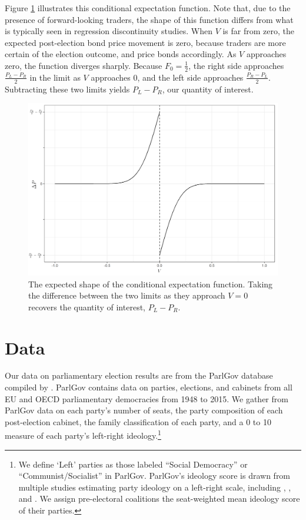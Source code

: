 \documentclass[12pt]{article}
\begin{document}
Figure \ref{fig:CEF} illustrates this conditional expectation function. Note that, due to the presence of forward-looking traders, the shape of this function differs from what is typically seen in regression discontinuity studies. When $V$ is far from zero, the expected post-election bond price movement is zero, because traders are more certain of the election outcome, and price bonds accordingly. As $V$ approaches zero, the function diverges sharply. Because $F_0 =\frac{1}{2}$, the right side approaches $\frac{P_L - P_R}{2}$ in the limit as $V$ approaches $0$, and the left side approaches $\frac{P_R - P_L}{2}$. Subtracting these two limits yields $P_L - P_R$, our quantity of interest. 

\begin{figure}[h]
    \centering
    \includegraphics[width=\textwidth]{figures/Figure1.png}
    \caption{The expected shape of the conditional expectation function. Taking the difference between the two limits as they approach $V=0$ recovers the quantity of interest, $P_L - P_R$.}
    \label{fig:CEF}
\end{figure}



\section{Data} \label{section:data}

Our data on parliamentary election results are from the ParlGov database compiled by \citet{Doring2018}. ParlGov contains data on parties, elections, and cabinets from all EU and OECD parliamentary democracies from 1948 to 2015. We gather from ParlGov data on each party's number of seats, the party composition of each post-election cabinet, the family classification of each party, and a 0 to 10 measure of each party's left-right ideology.\footnote{We define `Left' parties as those labeled ``Social Democracy'' or ``Communist/Socialist'' in ParlGov. ParlGov's ideology score is drawn from multiple studies estimating party ideology on a left-right scale, including \citet{Castles1984}, \citet{Huber1995}, and \citet{Benoit2006}. We assign pre-electoral coalitions the seat-weighted mean ideology score of their parties.}
\end{document}

